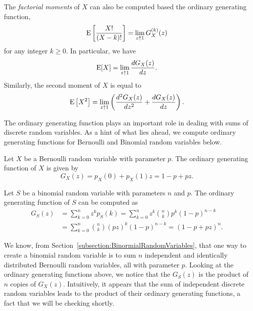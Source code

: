 The \emph{factorial moments} of $X$ can also be computed based the ordinary generating function,
\begin{equation*}
\mathrm{E} \left[ \frac{X!}{(X-k)!} \right]
= \lim_{z \uparrow 1} G_X^{(k)} (z)
\end{equation*}
for any integer $k \geq 0$.
In particular, we have
\begin{equation*}
\mathrm{E} [X] = \lim_{z \uparrow 1} \frac{d G_X(z)}{dz} .
\end{equation*}
Similarly, the second moment of $X$ is equal to
\begin{equation*}
\mathrm{E} \left[ X^2 \right]
= \lim_{z \uparrow 1} \left( \frac{d^2 G_X(z)}{dz^2} + \frac{d G_X(z)}{dz} \right) .
\end{equation*}

The ordinary generating function plays an important role in dealing with sums of discrete random variables.
As a hint of what lies ahead, we compute ordinary generating functions for Bernoulli and Binomial random variables below.

\begin{example}
Let $X$ be a Bernoulli random variable with parameter $p$.
The ordinary generating function of $X$ is given by
\begin{equation*}
G_X(z) = p_X(0) + p_X(1) z
= 1 - p + pz .
\end{equation*}
\end{example}

\begin{example}
Let $S$ be a binomial random variable with parameters $n$ and $p$.
The ordinary generating function of $S$ can be computed as
\begin{equation*}
\begin{split}
G_S(z) &= \sum_{k=0}^{n} z^k p_S (k)
= \sum_{k=0}^{n} z^k \binom{n}{k} p^k (1 - p)^{n-k} \\
&= \sum_{k=0}^{n} \binom{n}{k} (pz)^k (1 - p)^{n-k}
= (1 - p + pz)^n .
\end{split}
\end{equation*}
\end{example}

We know, from Section~\ref{subsection:BinormialRandomVariables}, that one way to create a binomial random variable is to sum $n$ independent and identically distributed Bernoulli random variables, all with parameter $p$.
Looking at the ordinary generating functions above, we notice that the $G_S(z)$ is the product of $n$ copies of $G_X(z)$.
Intuitively, it appears that the sum of independent discrete random variables leads to the product of their ordinary generating functions, a fact that we will be checking shortly.

